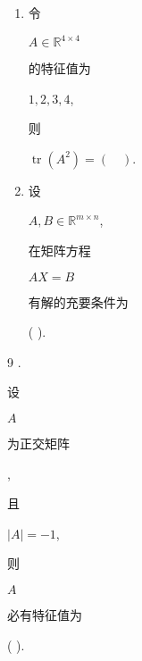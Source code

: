 \documentclass[10pt]{article}
\begin{document}
\begin{enumerate}
  \item \begin{CJK}{UTF8}{mj}令\end{CJK} $A \in \mathbb{R}^{4 \times 4}$ \begin{CJK}{UTF8}{mj}的特征值为\end{CJK} $1,2,3,4$, \begin{CJK}{UTF8}{mj}则\end{CJK} $\operatorname{tr}\left(A^{2}\right)=(\quad)$.

  \item \begin{CJK}{UTF8}{mj}设\end{CJK} $A, B \in \mathbb{R}^{m \times n}$, \begin{CJK}{UTF8}{mj}在矩阵方程\end{CJK} $A X=B$ \begin{CJK}{UTF8}{mj}有解的充要条件为\end{CJK} ( ).

\end{enumerate}
9 . \begin{CJK}{UTF8}{mj}设\end{CJK} $A$ \begin{CJK}{UTF8}{mj}为正交矩阵\end{CJK}, \begin{CJK}{UTF8}{mj}且\end{CJK} $|A|=-1$, \begin{CJK}{UTF8}{mj}则\end{CJK} $A$ \begin{CJK}{UTF8}{mj}必有特征值为\end{CJK} ( ).
\end{document}
